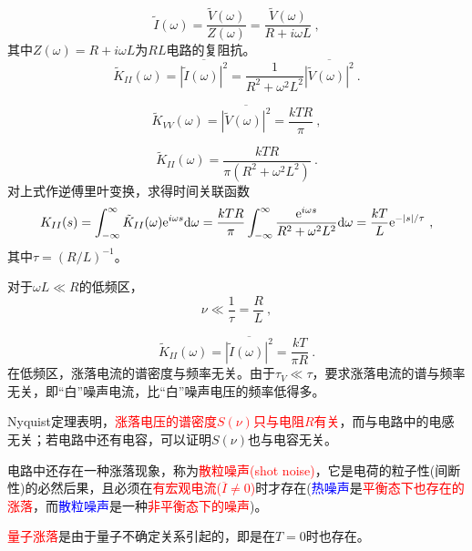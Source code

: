\documentclass[11pt,a4paper]{article}
\newcommand{\dif}{\mathrm{d}}
\begin{document}
\begin{equation}
\tilde{I}(\omega) = \dfrac{\tilde{V}(\omega)}{Z(\omega)} =  \dfrac{\tilde{V}(\omega)}{R+i \omega L} ~,
\end{equation}
其中$Z(\omega) = R +i\omega L$为$RL$电路的复阻抗。
\begin{equation}
\tilde{K}_{II}(\omega) = \overline{|\tilde{I}(\omega)|^2} = \dfrac{1}{R^2 +\omega^2 L^2}  \overline{|\tilde{V}(\omega)|^2} ~.
\end{equation}

\begin{equation}
\tilde{K}_{VV}(\omega) = \overline{|\tilde{V}(\omega)|^2} = \dfrac{kTR}{\pi} ~,
\end{equation}

\begin{equation}
\tilde{K}_{II}(\omega) = \dfrac{kTR}{\pi(R^2 +\omega^2 L^2)}~.
\end{equation}
对上式作逆傅里叶变换，求得时间关联函数
\begin{align}
K_{II}(s) = \int_{-\infty}^\infty \tilde{K}_{II}(\omega) {\rm e}^{i\omega s} \dif \omega = \dfrac{kTR}{\pi} \int_{-\infty}^\infty \dfrac{{\rm e}^{i\omega s}}{R^2 +\omega^2 L^2}  \dif \omega = \dfrac{kT}{L} {\rm e}^{-|s|/\tau} ~,
\end{align}
其中$\tau = (R/L)^{-1}$。

对于$\omega L \ll R$的低频区，
\begin{equation}
\nu \ll \dfrac{1}{\tau} = \dfrac{R}{L} ~,
\end{equation}

\begin{equation}
\tilde{K}_{II}(\omega) =\overline{|\tilde{I}(\omega)|^2} = \dfrac{kT}{\pi R} ~.
\end{equation}
在低频区，涨落电流的谱密度与频率无关。由于$\tau_V \ll \tau$，要求涨落电流的谱与频率无关，即``白”噪声电流，比``白”噪声电压的频率低得多。

Nyquist定理表明，\textcolor{red}{涨落电压的谱密度$S(\nu)$只与电阻$R$有关}，而与电路中的电感无关；若电路中还有电容，可以证明$S(\nu)$也与电容无关。

电路中还存在一种涨落现象，称为\textcolor{red}{散粒噪声(shot noise)}，它是电荷的粒子性(间断性)的必然后果，且必须在\textcolor{red}{有宏观电流($\overline{I} \neq 0$)}时才存在(\textcolor{blue}{热噪声}是\textcolor{red}{平衡态下也存在的涨落}，而\textcolor{blue}{散粒噪声}是一种\textcolor{red}{非平衡态下的噪声})。

\textcolor{red}{量子涨落}是由于量子不确定关系引起的，即是在$T = 0$时也存在。
\end{document}

